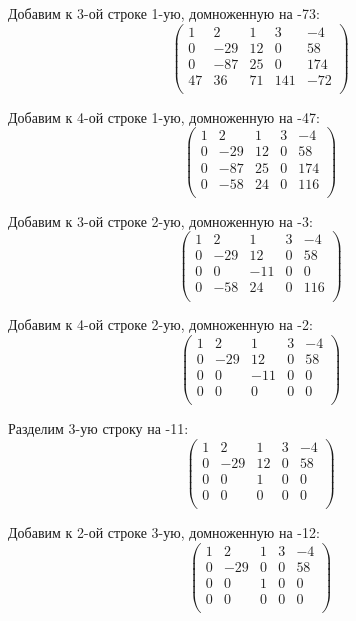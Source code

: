 	 Добавим к 3-ой строке 1-ую, домноженную на -73:
	 \[
	 \begin{pmatrix}
	 1 & 2 & 1 & 3 & -4 \\
	 0 & -29 & 12 & 0 & 58 \\
	 0 & -87 & 25 & 0 & 174 \\
	 47 & 36 & 71 & 141 & -72 \\
	 \end{pmatrix}
	 \]
	 
	 Добавим к 4-ой строке 1-ую, домноженную на -47:
	 \[
	 \begin{pmatrix}
	 1 & 2 & 1 & 3 & -4 \\
	 0 & -29 & 12 & 0 & 58 \\
	 0 & -87 & 25 & 0 & 174 \\
	 0 & -58 & 24 & 0 & 116 \\
	 \end{pmatrix}
	 \]
	 
	 Добавим к 3-ой строке 2-ую, домноженную на -3:
	 \[
	 \begin{pmatrix}
	 1 & 2 & 1 & 3 & -4 \\
	 0 & -29 & 12 & 0 & 58 \\
	 0 & 0 & -11 & 0 & 0 \\
	 0 & -58 & 24 & 0 & 116 \\
	 \end{pmatrix}
	 \]
	 
	 Добавим к 4-ой строке 2-ую, домноженную на -2:
	 \[
	 \begin{pmatrix}
	 1 & 2 & 1 & 3 & -4 \\
	 0 & -29 & 12 & 0 & 58 \\
	 0 & 0 & -11 & 0 & 0 \\
	 0 & 0 & 0 & 0 & 0 \\
	 \end{pmatrix}
	 \]
	 
	 Разделим 3-ую строку на -11:
	 \[
	 \begin{pmatrix}
	 1 & 2 & 1 & 3 & -4 \\
	 0 & -29 & 12 & 0 & 58 \\
	 0 & 0 & 1 & 0 & 0 \\
	 0 & 0 & 0 & 0 & 0 \\
	 \end{pmatrix}
	 \]
	 
	 Добавим к 2-ой строке 3-ую, домноженную на -12:
	 \[
	 \begin{pmatrix}
	 1 & 2 & 1 & 3 & -4 \\
	 0 & -29 & 0 & 0 & 58 \\
	 0 & 0 & 1 & 0 & 0 \\
	 0 & 0 & 0 & 0 & 0 \\
	 \end{pmatrix}
	 \]
	 
